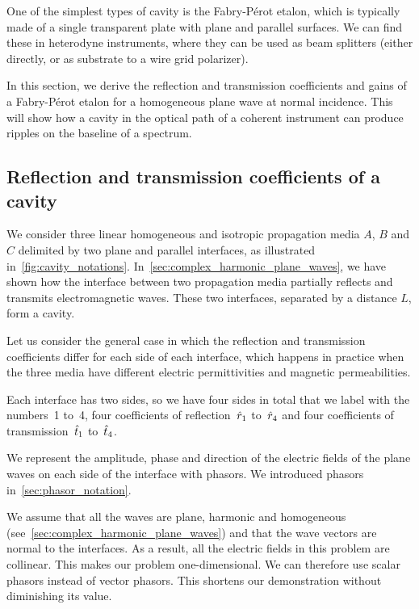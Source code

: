 One of the simplest types of cavity is the Fabry-Pérot etalon, which is typically made of a single transparent plate with plane and parallel surfaces.
We can find these in heterodyne instruments, where they can be used as beam splitters (either directly, or as substrate to a wire grid polarizer).

In this section, we derive the reflection and transmission coefficients and gains of a Fabry-Pérot etalon for a homogeneous plane wave at normal incidence.
This will show how a cavity in the optical path of a coherent instrument can produce ripples on the baseline of a spectrum.




\subsection{Reflection and transmission coefficients of a cavity}

We consider three linear homogeneous and isotropic propagation media $A$, $B$ and $C$
delimited by two plane and parallel interfaces, as illustrated in~\cref{fig:cavity_notations}.
In~\cref{sec:complex_harmonic_plane_waves}, we have shown how the interface between two propagation media partially reflects and transmits electromagnetic waves.
These two interfaces, separated by a distance $L$, form a cavity.

Let us consider the general case in which the reflection and transmission coefficients differ for each side of each interface,
which happens in practice when the three media have different electric permittivities and magnetic permeabilities.

Each interface has two sides, so we have four sides in total that we label with the numbers~1 to~4,
four coefficients of reflection~$\hat{r}_1$ to~$\hat{r}_4$ and
four coefficients of transmission~$\hat{t}_1$ to~$\hat{t}_4$.

We represent the amplitude, phase and direction of the electric fields of the plane waves on each side of the interface with phasors.
We introduced phasors in~\cref{sec:phasor_notation}.

We assume that all the waves are plane, harmonic and homogeneous
(see~\cref{sec:complex_harmonic_plane_waves})
and that the wave vectors are normal to the interfaces.
As a result, all the electric fields in this problem are collinear.
This makes our problem one-dimensional.
We can therefore use scalar phasors instead of vector phasors.
This shortens our demonstration without diminishing its value.

